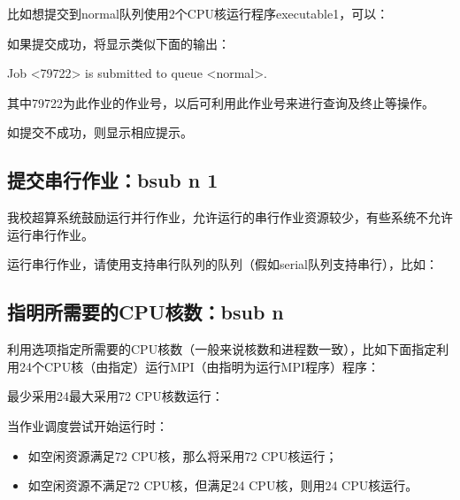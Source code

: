 \documentclass[a4paper,12pt,english]{sphinxmanual}
\begin{document}
\sphinxAtStartPar
比如想提交到normal队列使用2个CPU核运行程序executable1，可以：

\sphinxAtStartPar
{}

\sphinxAtStartPar
如果提交成功，将显示类似下面的输出：

\sphinxAtStartPar
Job <79722> is submitted to queue <normal>.

\sphinxAtStartPar
其中79722为此作业的作业号，以后可利用此作业号来进行查询及终止等操作。

\sphinxAtStartPar
如提交不成功，则显示相应提示。


\subsection{提交串行作业：bsub \sphinxhyphen{}n 1}
\label{\detokenize{lsf/lsf:bsub-n-1}}
\sphinxAtStartPar
我校超算系统鼓励运行并行作业，允许运行的串行作业资源较少，有些系统不允许运行串行作业。

\sphinxAtStartPar
运行串行作业，请使用支持串行队列的队列（假如serial队列支持串行），比如：

\sphinxAtStartPar
{}


\subsection{指明所需要的CPU核数：bsub \sphinxhyphen{}n}
\label{\detokenize{lsf/lsf:cpu-bsub-n}}
\sphinxAtStartPar
利用选项指定所需要的CPU核数（一般来说核数和进程数一致），比如下面指定利用24个CPU核（由指定）运行MPI（由指明为运行MPI程序）程序：

\sphinxAtStartPar
{}

\sphinxAtStartPar
最少采用24最大采用72 CPU核数运行：

\sphinxAtStartPar
当作业调度尝试开始运行时：
\begin{itemize}
\item {} 
\sphinxAtStartPar
如空闲资源满足72 CPU核，那么将采用72 CPU核运行；

\item {} 
\sphinxAtStartPar
如空闲资源不满足72 CPU核，但满足24 CPU核，则用24 CPU核运行。

\end{itemize}
\end{document}
